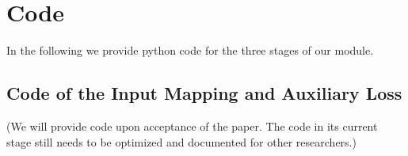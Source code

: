 \documentclass[11pt]{article}
\begin{document}
\section{Code}
\label{appendix-code}





In the following we provide python code for the three stages of our module.


\subsection{Code of the Input Mapping and Auxiliary Loss}
\label{appendix-code-input-and-auxiliary-loss}


(We will provide code upon acceptance of the paper. The code in its current stage still needs to be optimized and documented for other researchers.)

\end{document}
